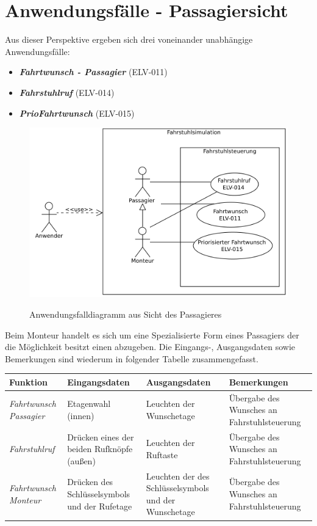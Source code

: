 \section{Anwendungsfälle - Passagiersicht}
Aus dieser Perspektive ergeben sich drei voneinander unabhängige Anwendungsfälle:

\begin{itemize}
	\item \textit{\textbf{\gls{Fahrtwunsch} - Passagier}} (ELV-011)
	\item \textit{\textbf{\gls{Fahrstuhlruf} }} (ELV-014)
	\item \textit{\textbf{\gls{PrioFahrtwunsch}}} (ELV-015)
\end{itemize}


\begin{figure}[hbt]
	\includegraphics{images/passagierAWF.png}
	\label{fig:passagierAWF}
	\caption{Anwendungsfalldiagramm aus Sicht des Passagieres}
\end{figure}
Beim \gls{Monteur} handelt es sich um eine Spezialisierte Form eines \gls{Passagier}s der die Möglichkeit besitzt einen  abzugeben.
Die Eingangs-, Ausgangsdaten sowie Bemerkungen sind wiederum in folgender Tabelle zusammengefasst.

 {
\vspace{1cm}
\hspace{-0,5cm}
\footnotesize
\begin{tabular}{|p{2cm}|p{3cm}|p{3cm}|p{3cm}|}
	\hline
		\textbf{Funktion} &
		\textbf{Eingangsdaten} &
		\textbf{Ausgangsdaten} &
		\textbf{Bemerkungen} \\
	\hline \hline
		\textit{Fahrtwunsch \newline Passagier} &
		Etagenwahl (innen) &
		Leuchten der Wunschetage &
		Übergabe des Wunsches an Fahrstuhlsteuerung \\
	\hline
		\textit{Fahrstuhlruf} &
		Drücken eines der beiden Rufknöpfe (außen) &
		Leuchten der Ruftaste &
		Übergabe des Wunsches an Fahrstuhlsteuerung  \\
	\hline
		\textit{Fahrtwunsch \newline Monteur} &
		Drücken des Schlüsselsymbols und der Rufetage &
		Leuchten der des Schlüsselsymbols und der Wunschetage &
		Übergabe des Wunsches an Fahrstuhlsteuerung  \\
	\hline
\end{tabular}
}

